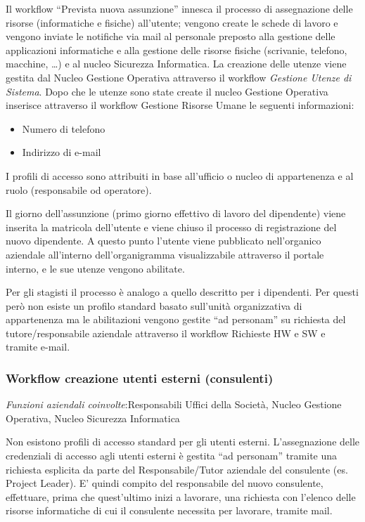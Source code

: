 Il workflow ``Prevista nuova assunzione''
innesca il processo di assegnazione delle risorse (informatiche e fisiche)
all'utente;
vengono create le schede di lavoro e vengono inviate le notifiche via
mail al personale preposto alla gestione delle applicazioni
informatiche e alla gestione delle risorse fisiche (scrivanie,
telefono, macchine, \dots) e al nucleo Sicurezza Informatica. La
creazione delle utenze viene gestita dal Nucleo Gestione Operativa
attraverso il workflow \textit{Gestione Utenze di Sistema}. Dopo che
le utenze sono state create il nucleo Gestione Operativa inserisce
attraverso il workflow Gestione Risorse Umane le seguenti informazioni:

\begin{itemize}
\item Numero di telefono 
\item Indirizzo di e-mail
\end{itemize}

I profili di accesso sono attribuiti in base all'ufficio
o nucleo di appartenenza e al ruolo (responsabile od operatore).

Il giorno dell'assunzione (primo giorno effettivo di
lavoro del dipendente) viene inserita la matricola
dell'utente e viene chiuso il processo di registrazione
del nuovo dipendente. A questo punto l'utente viene
pubblicato nell'organico aziendale
all'interno dell'organigramma
visualizzabile attraverso il portale interno, e le sue utenze vengono
abilitate.

Per gli stagisti il processo \`e analogo a quello descritto per i
dipendenti. Per questi per\`o non esiste un profilo standard basato
sull'unit\`a organizzativa di appartenenza ma le
abilitazioni vengono gestite ``ad
personam'' su richiesta del tutore/responsabile
aziendale attraverso il workflow Richieste HW e SW e tramite e-mail.


\subsubsection{Workflow creazione utenti esterni (consulenti)}

\textit{Funzioni aziendali coinvolte}:Responsabili
Uffici della Societ\`a, Nucleo Gestione Operativa, Nucleo Sicurezza
Informatica


Non esistono profili di accesso standard per gli utenti esterni.
L'assegnazione delle credenziali di accesso agli utenti
esterni \`e gestita ``ad personam''
tramite una richiesta esplicita da parte del Responsabile/Tutor
aziendale del consulente (es. Project Leader). E'
quindi compito del responsabile del nuovo consulente, effettuare, prima
che quest'ultimo inizi a lavorare, una richiesta con
l'elenco delle risorse informatiche di cui il
consulente necessita per lavorare, tramite mail.

